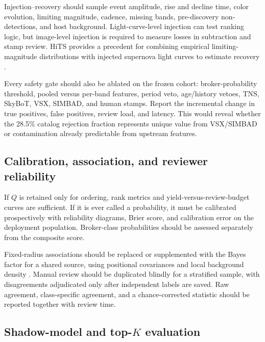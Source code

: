 \documentclass[11pt]{article}
\begin{document}
Injection--recovery should sample event amplitude, rise and decline time, color evolution, limiting magnitude, cadence, missing bands, pre-discovery non-detections, and host background. Light-curve-level injection can test ranking logic, but image-level injection is required to measure losses in subtraction and stamp review. HiTS provides a precedent for combining empirical limiting-magnitude distributions with injected supernova light curves to estimate recovery \citep{forster2016}.

Every safety gate should also be ablated on the frozen cohort: broker-probability threshold, pooled versus per-band features, period veto, age/history vetoes, TNS, SkyBoT, VSX, SIMBAD, and human stamps. Report the incremental change in true positives, false positives, review load, and latency. This would reveal whether the 28.5\% catalog rejection fraction represents unique value from VSX/SIMBAD or contamination already predictable from upstream features.

\subsection{Calibration, association, and reviewer reliability}

If $Q$ is retained only for ordering, rank metrics and yield-versus-review-budget curves are sufficient. If it is ever called a probability, it must be calibrated prospectively with reliability diagrams, Brier score, and calibration error on the deployment population. Broker-class probabilities should be assessed separately from the composite score.

Fixed-radius associations should be replaced or supplemented with the Bayes factor for a shared source, using positional covariances and local background density \citep{budavari2008}. Manual review should be duplicated blindly for a stratified sample, with disagreements adjudicated only after independent labels are saved. Raw agreement, class-specific agreement, and a chance-corrected statistic should be reported together with review time.

\subsection{Shadow-model and top-$K$ evaluation}
\end{document}

